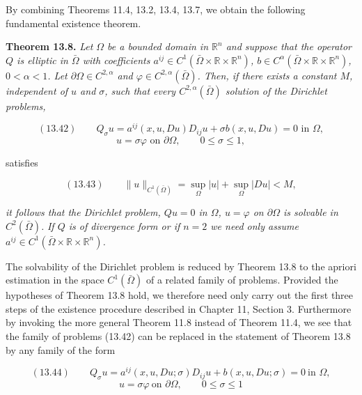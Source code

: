 By combining Theorems 11.4, 13.2, 13.4, 13.7, we obtain the following fundamental
existence theorem.

\begin{theorem}\label{thm:gt13-holder-gradient-13-8}
\textbf{Theorem 13.8.} \textit{Let $\Omega$ be a bounded domain in $\mathbb{R}^n$ and suppose that the operator $Q$
is elliptic in $\bar{\Omega}$ with coefficients $a^{ij} \in C^1(\bar{\Omega}\times \mathbb{R}\times \mathbb{R}^n)$, $b \in C^\alpha(\bar{\Omega}\times \mathbb{R}\times \mathbb{R}^n)$, $0<\alpha<1$.
Let $\partial \Omega \in C^{2,\alpha}$ and $\varphi \in C^{2,\alpha}(\bar{\Omega})$. Then, if there exists a constant $M$, independent of $u$
and $\sigma$, such that every $C^{2,\alpha}(\bar{\Omega})$ solution of the Dirichlet problems,}
\end{theorem}

\begin{equation}
(13.42)\qquad Q_\sigma u=a^{ij}(x,u,Du) D_{ij}u+\sigma b(x,u,Du)=0 \text{ in } \Omega,
\end{equation}
\[
u=\sigma\varphi \text{ on } \partial \Omega,\qquad 0\leq \sigma\leq 1,
\]



satisfies

\[
(13.43)\qquad \|u\|_{C^1(\bar{\Omega})}=\sup_{\Omega}|u|+\sup_{\Omega}|Du|<M,
\]

\emph{it follows that the Dirichlet problem, $Qu=0$ in $\Omega$, $u=\varphi$ on $\partial\Omega$ is solvable in $C^2(\bar{\Omega})$.}
\emph{If $Q$ is of divergence form or if $n=2$ we need only assume $a^{ij}\in C^1(\bar{\Omega}\times \mathbb{R}\times \mathbb{R}^n)$.}

The solvability of the Dirichlet problem is reduced by Theorem 13.8 to the
apriori estimation in the space $C^1(\bar{\Omega})$ of a related family of problems. Provided the
hypotheses of Theorem 13.8 hold, we therefore need only carry out the first three
steps of the existence procedure described in Chapter 11, Section 3. Furthermore
by invoking the more general Theorem 11.8 instead of Theorem 11.4, we see that
the family of problems (13.42) can be replaced in the statement of Theorem 13.8 by
any family of the form

\[
(13.44)\qquad Q_\sigma u=a^{ij}(x,u,Du;\sigma)D_{ij}u+b(x,u,Du;\sigma)=0\ \text{in }\Omega,
\]
\[
u=\sigma\varphi\ \text{on }\partial\Omega,\qquad 0\le \sigma\le 1
\]

